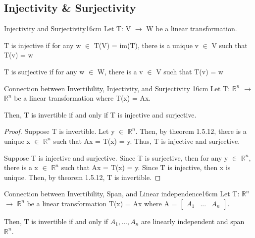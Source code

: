 \subsection{ Injectivity \& Surjectivity }

    \begin{definition}{Injectivity and Surjectivity}{16cm}
        Let T: V $\rightarrow$ W be a linear transformation.

        T is {\color{lblue} injective} if for any w $\in$ T(V) = im(T),
        there is a unique v $\in$ V such that T(v) = w

        T is {\color{lblue} surjective} if for any w $\in$ W,
        there is a v $\in$ V such that T(v) = w
    \end{definition}

    \vspace{0.5cm}



    \begin{wtheorem}{Connection between Invertibility, Injectivity,
    and Surjectivity }{16cm}
        Let T: $\mathbb{R}^n$ $\rightarrow$ $\mathbb{R}^n$
        be a linear transformation where T(x) = Ax.
        
        Then, T is invertible if and only if T is injective and surjective.
    \end{wtheorem}

    \begin{proof}
        Suppose T is invertible.
        Let y $\in$ $\mathbb{R}^n$.
        Then, by {\color{red} theorem 1.5.12},
        there is a unique x $\in$ $\mathbb{R}^n$ such that Ax = T(x) = y.
        Thus, T is injective and surjective.

        \vspace{0.2cm}

        Suppose T is injective and surjective.
        Since T is surjective, then for any y $\in$ $\mathbb{R}^n$,
        there is a x $\in$ $\mathbb{R}^n$ such that Ax = T(x) = y.
        Since T is injective, then x is unique.
        Then, by {\color{red} theorem 1.5.12}, T is invertible.
    \end{proof}

    \vspace{0.5cm}



    \begin{wtheorem}{Connection between Invertibility, Span, and
    Linear independence}{16cm}
        Let T: $\mathbb{R}^n$ $\rightarrow$ $\mathbb{R}^n$
        be a linear transformation T(x) = Ax where A =
        $\begin{bmatrix}
            A_1 & ... & A_n
        \end{bmatrix}$.

        Then, T is invertible if and only if $A_1,...,A_n$
        are linearly independent and span $\mathbb{R}^n$.
    \end{wtheorem}

